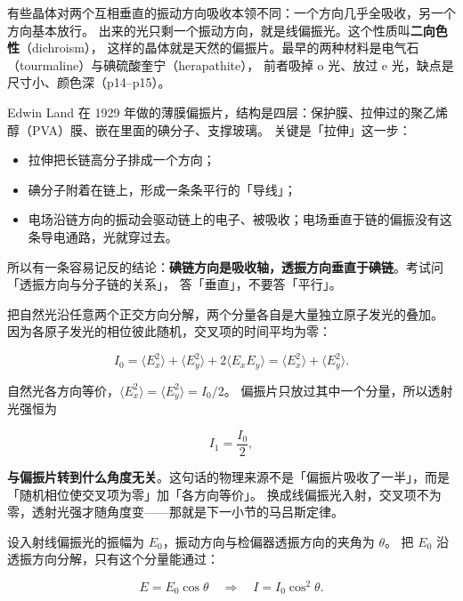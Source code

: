 \documentclass[11pt]{ctexart}
\begin{document}

有些晶体对两个互相垂直的振动方向吸收本领不同：一个方向几乎全吸收，另一个方向基本放行。
出来的光只剩一个振动方向，就是线偏振光。这个性质叫\textbf{二向色性}（dichroism），
这样的晶体就是天然的偏振片。最早的两种材料是电气石（tourmaline）与碘硫酸奎宁（herapathite），
前者吸掉 o 光、放过 e 光，缺点是尺寸小、颜色深（p14--p15）。


Edwin Land 在 1929 年做的薄膜偏振片，结构是四层：保护膜、拉伸过的聚乙烯醇（PVA）膜、嵌在里面的碘分子、支撑玻璃。
关键是「拉伸」这一步：

\begin{itemize}
\item 拉伸把长链高分子排成一个方向；
\item 碘分子附着在链上，形成一条条平行的「导线」；
\item 电场沿链方向的振动会驱动链上的电子、被吸收；电场垂直于链的偏振没有这条导电通路，光就穿过去。
\end{itemize}

所以有一条容易记反的结论：\textbf{碘链方向是吸收轴，透振方向垂直于碘链}。考试问「透振方向与分子链的关系」，
答「垂直」，不要答「平行」。


把自然光沿任意两个正交方向分解，两个分量各自是大量独立原子发光的叠加。
因为各原子发光的相位彼此随机，交叉项的时间平均为零：

\[
I_0=\langle E_x^2\rangle+\langle E_y^2\rangle+2\langle E_xE_y\rangle
=\langle E_x^2\rangle+\langle E_y^2\rangle .
\]

自然光各方向等价，$\langle E_x^2\rangle=\langle E_y^2\rangle=I_0/2$。
偏振片只放过其中一个分量，所以透射光强恒为

\[
I_1=\frac{I_0}{2},
\]

\textbf{与偏振片转到什么角度无关}。这句话的物理来源不是「偏振片吸收了一半」，而是「随机相位使交叉项为零」加「各方向等价」。
换成线偏振光入射，交叉项不为零，透射光强才随角度变——那就是下一小节的马吕斯定律。


设入射线偏振光的振幅为 $E_0$，振动方向与检偏器透振方向的夹角为 $\theta$。
把 $E_0$ 沿透振方向分解，只有这个分量能通过：

\[
E=E_0\cos\theta
\quad\Longrightarrow\quad
I=I_0\cos^2\theta .
\]
\end{document}
